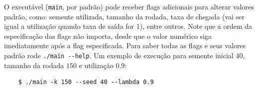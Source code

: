\documentclass[a4paper]{article}
\newcommand{\inlcode}{\texttt}
\begin{document}
O executável (\inlcode{main}, por padrão)
pode receber flags adicionais para alterar valores padrão,
como: semente utilizada, tamanho da rodada,
taxa de chegada
(vai ser igual a utilização quando taxa de saída for 1),
entre outros.
Note que a ordem da especificação das flags não importa,
desde que o valor numérico siga imediatamente após
a flag especificada.
Para saber todas as flags e seus valores padrão
rode \inlcode{./main -{}-help}.
Um exemplo de execução para semente inicial \(40\),
tamanho da rodada \(150\) e utilização \(0.9\):
\begin{verbatim}
    $ ./main -k 150 --seed 40 --lambda 0.9
\end{verbatim}
\end{document}
